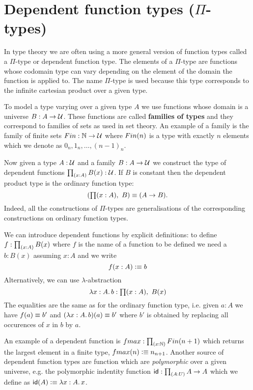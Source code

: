 
\section{Dependent function types (\texorpdfstring{$\Pi$}{Π}-types)}
\label{sec:pi-types}

In type theory we are often using a more general version of function
types called a $\Pi$-type or dependent function type. The elements of
a $\Pi$-type are functions whose codomain type can vary depending on the
element of the domain the function is applied to. The name $\Pi$-type
is used because this type corresponds to the infinite cartesian
product over a given type.

To model a type varying over a given type $A$ we use functions whose
domain is a universe $B : A \to \mathcal{U}$. These functions are called
\textbf{families of types} and they correspond to families of sets as used in
set theory. An example of a family is the family of finite sets $Fin
: \mathbb{N} \to \mathcal{U}$ where $Fin(n)$ is a type with exactly $n$ elements
which we denote as $0_n,1_n,\dots,(n-1)_n$. 

Now given a type $A:\mathcal{U}$ and a family $B:A \to \mathcal{U}$ we construct
the type of dependent functions $\prd{x:A}B(x) : \UU$. If $B$ is
constant then the dependent product type is the ordinary function type:
\[(\prd{x:A} B) \jdeq (A \to B).\]
Indeed, all the constructions of $\Pi$-types are generalisations of the corresponding constructions on ordinary function types.

We can introduce dependent functions by explicit definitions: to
define $f : \prd{x:A}B(x)$ where $f$ is the name of a function to be
defined we need a $b : B(x)$ assuming $x:A$ and we write
\[ f(x : A) \vcentcolon\equiv b \]
Alternatively, we can use $\lambda$-abstraction 
\[ \lam{x:A} b : \prd{x:A} B(x) \]
The equalities are the same as for the ordinary function type, i.e.
given $a:A$ we have $f(a) \equiv b'$ and  
$(\lam{x:A} b)(a) \jdeq b'$ where $b' $ is obtained by replacing all
occurences of $x$ in $b$ by $a$.

An example of a dependent function is $\fmax : \prd{x:\nat} \Fin(n+1)$
which returns the largest element in a finite type, $fmax(n) \vcentcolon\equiv
n_{n+1}$. 
Another source of dependent function types
are function which are \emph{polymorphic} over a given universe,
e.g. the polymorphic indentity function $\idf : \prd{A:U} A \to A$
which we define as $\idf(A) \defeq \lam{x:A}x$.


